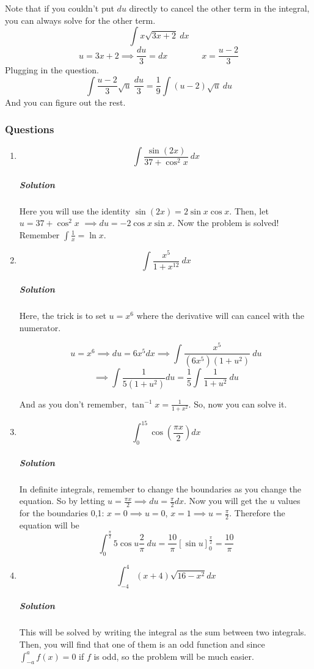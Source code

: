 \documentclass{article}
\begin{document}
Note that if you couldn't put $du$ directly to cancel the other term in the integral, you can always solve for the other term.
\[
	\int x \sqrt{ 3x+2 }\ dx 
\]
\[
	u = 3x + 2 \implies \frac{du}{3} = dx \qquad \qquad x = \frac{u-2}{3}
\]
Plugging in the  question.
\[
	\int \frac{ u-2 }{ 3 } \sqrt{ u }\ \frac{du}{3} = \frac{1}{9} \int (u-2) \sqrt{ u }\ du 
\]
And you can figure out the rest.

\newpage
\subsubsection{Questions}
\begin{enumerate}[1.]
	\item \[	\int \frac{ \sin(2x) }{ 37 + \cos^2{x}}\ dx  \]
\subparagraph{Solution}

Here you will use the identity $ \sin(2x) = 2 \sin{ x } \cos{ x }  $. Then, let $ u = 37+\cos^2x 
$ $\implies du=-2 \cos{ x } \sin{ x } $. Now the problem is solved! Remember $\int \frac{1}{x}= \ln{x}$.

\item \[ \int \frac{x^5}{1+x^{12}}\ dx \]

	\subparagraph{Solution}
	Here, the trick is to set $u=x^6$ where the derivative will can cancel with the numerator. 

		\[
			u = x^6 \implies du = 6x^5dx \implies \int \frac{ x^5 }{ (6x^5) (1+u^2) } \ du 
		\]
		\[
			\implies \int \frac{ 1 }{ 5(1+u^2) } du = \frac{1}{5} \int \frac{ 1 }{ 1 + u^2 }\ du
		\]
	
	And as you don't remember, $ \tan^{-1}x= \frac{ 1 }{ 1 + x^2 }  $. So, now you can solve it. 

\item \[
		\int_0^15 \cos{ (\frac{ \pi x }{ 2 } ) } dx
\]

\subparagraph{Solution}
In definite integrals, remember to change the boundaries as you change the equation. 
So by letting $u= \frac{ \pi x  }{ 2 } \implies du = \frac{\pi}{2} dx$. Now you will get the $u$ values for the boundaries 0,1: $ x=0 \implies u = 0 $, $ x = 1 \implies u = \frac{\pi}{2} $. Therefore the equation will be
\[
	\int_0^{\frac{\pi}{2}} 5 \cos{ u } \frac{2}{\pi}\ du = \frac{10}{\pi} \left[ \sin{ u }  \right]^{ \frac{\pi}{2} }_{0} = \frac{10}{\pi}
\]

\item \[ \int^4_{-4} (x+4) \sqrt{ 16-x^2 } dx \]
	
	\subparagraph{Solution}
		This will be solved by writing the integral as the sum between two integrals. Then, you will find that one of them is an odd function and since $ \int^a_{-a}f(x) = 0 $ if $ f $ is odd, so the problem will be much easier.


\end{enumerate}
\end{document}
